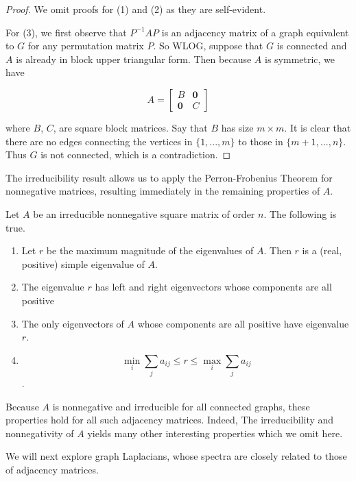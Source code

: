 \begin{proof}
  We omit proofs for (1) and (2) as they are self-evident.

  For (3), we first observe that $P^{-1}AP$ is an adjacency matrix of a graph
  equivalent to $G$ for any permutation matrix $P$. So WLOG, suppose that $G$ is
  connected and $A$ is already in block upper triangular form. Then because $A$
  is symmetric, we have

  \[
    A = \begin{bmatrix}
      B & \mathbf{0} \\
      \mathbf{0} & C
    \end{bmatrix}
  \]

  where $B$, $C$, are square block matrices. Say that $B$ has size $m \times m$. It is clear that
  there are no edges connecting the vertices in $\{1, ..., m\}$ to those in $\{m+1, ..., n\}$. Thus
  $G$ is not connected, which is a contradiction.
\end{proof}

The irreducibility result allows us to apply the Perron-Frobenius Theorem for
nonnegative matrices, resulting immediately in the remaining properties of $A$.

\begin{theorem}
  Let $A$ be an irreducible nonnegative square matrix of order $n$. The
  following is true.

  \begin{enumerate}
  \item Let $r$ be the maximum magnitude of the eigenvalues of $A$. Then $r$ is
    a (real, positive) simple eigenvalue of $A$.
  \item The eigenvalue $r$ has left and right eigenvectors whose components are
    all positive
  \item The only eigenvectors of $A$ whose components are all positive have
    eigenvalue $r$.
  \item
    \[ \min_i \sum_j a_{ij} \leq r \leq \max_i \sum_j a_{ij} \].
  \end{enumerate}
\end{theorem}

Because $A$ is nonnegative and irreducible for all connected graphs, these
properties hold for all such adjacency matrices. Indeed, The irreducibility and
nonnegativity of $A$ yields many other interesting properties which we omit
here.

We will next explore graph Laplacians, whose spectra are closely related to
those of adjacency matrices.


